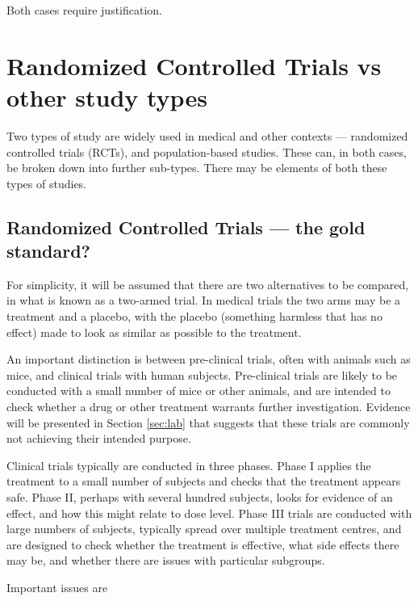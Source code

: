 \documentclass[
  10pt,
  b5paper]{book}
\begin{document}
Both cases require justification.

\hypertarget{ss:rct}{%
\section{Randomized Controlled Trials vs other study types}\label{ss:rct}}

Two types of study are widely used in medical and other contexts ---
randomized controlled trials (RCTs), and population-based studies.
These can, in both cases, be broken down into further sub-types.
There may be elements of both these types of studies.

\hypertarget{randomized-controlled-trials-the-gold-standard}{%
\subsection*{Randomized Controlled Trials --- the gold standard?}\label{randomized-controlled-trials-the-gold-standard}}

For simplicity, it will be assumed that there are two alternatives
to be compared, in what is known as a two-armed trial. In medical
trials the two arms may be a treatment and a placebo, with the
placebo (something harmless that has no effect) made to look as
similar as possible to the treatment.

An important distinction is between pre-clinical trials, often
with animals such as mice, and clinical trials with human
subjects. Pre-clinical trials are likely to be conducted
with a small number of mice or other animals, and are intended
to check whether a drug or other treatment warrants further
investigation. Evidence will be presented in Section \ref{sec:lab}
that suggests that these trials are commonly not achieving their
intended purpose.

Clinical trials typically are conducted in three phases.
Phase I applies the treatment to a small number of subjects
and checks that the treatment appears safe.
Phase II, perhaps with several hundred subjects, looks for
evidence of an effect, and how this might relate to dose level.
Phase III trials are conducted with large numbers of subjects,
typically spread over multiple treatment centres, and are
designed to check whether the treatment is effective, what
side effects there may be, and whether there are issues with
particular subgroups.

Important issues are
\end{document}
